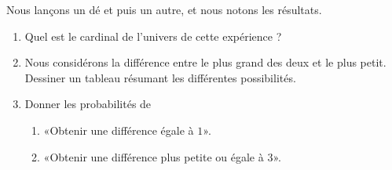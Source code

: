 
\begin{exercice}\label{exosmath-0357}

    Nous lançons un dé et puis un autre, et nous notons les résultats.
    \begin{enumerate}
        \item
            Quel est le cardinal de l'univers de cette expérience ?
        \item
            Nous considérons la différence entre le plus grand des deux et le plus petit. Dessiner un tableau résumant les différentes possibilités.
        \item
            Donner les probabilités de
            \begin{enumerate}
                \item
                    «Obtenir une différence égale à \( 1\)».
                \item
                    «Obtenir une différence plus petite ou égale à 3».
            \end{enumerate}
    \end{enumerate}


\end{exercice}

